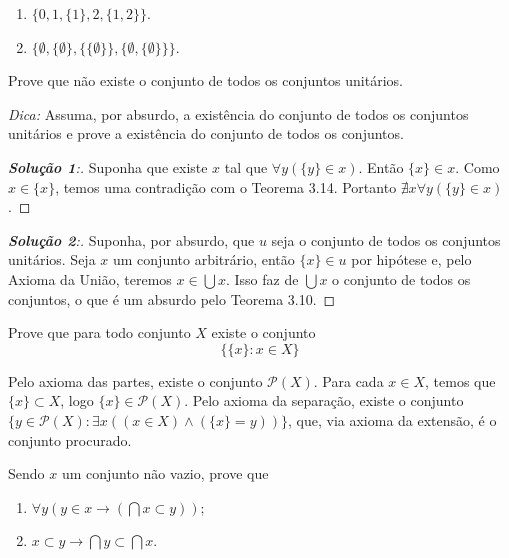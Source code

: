 \begin{enumerate}[label=(\alph{*})]
	\item $\{0,1,\{1\},2,\{1,2\}\}$.
	\item $\{\emptyset,\{\emptyset\},\{\{\emptyset\}\},\{\emptyset,\{\emptyset\}\}\}$.
\end{enumerate}


\begin{exercicio}
	Prove que não existe o conjunto de todos os conjuntos unitários.
	
	\emph{Dica:} Assuma, por absurdo, a existência do conjunto de todos os conjuntos unitários e prove a existência do conjunto de todos os conjuntos.
\end{exercicio}

\begin{proof}[\textbf{Solução 1}:]
	Suponha que existe $x$ tal que $\forall y(\{y\}\in x)$. Então $\{x\}\in x$. Como $x\in\{x\}$, temos uma contradição com o Teorema 3.14. Portanto $\nexists x\forall y(\{y\}\in x)$.
\end{proof}
	
\begin{proof}[\textbf{Solução 2}:]
	Suponha, por absurdo, que $u$ seja o conjunto de todos os conjuntos unitários. Seja $x$ um conjunto arbitrário, então $\{x\} \in u$ por hipótese e, pelo Axioma da União, teremos $x \in \bigcup x$. Isso faz de $\bigcup x$ o conjunto de todos os conjuntos, o que é um absurdo pelo Teorema 3.10.
\end{proof}
	

\begin{exercicio}
	Prove que para todo conjunto $X$ existe o conjunto
	$$\{\{x\}:x\in X\}$$
\end{exercicio}
\begin{solucao}
	Pelo axioma das partes, existe o conjunto $\mathcal{P}(X)$. Para cada $x\in X$, temos que $\{x\}\subset X$, logo $\{x\}\in\mathcal{P}(X)$. Pelo axioma da separação, existe o conjunto $\{y\in \mathcal{P}(X):\exists x((x\in X)\wedge(\{x\}=y))\}$, que, via axioma da extensão, é o conjunto procurado.
\end{solucao}

\begin{exercicio}
	Sendo $x$ um conjunto não vazio, prove que
	\begin{enumerate}[label=(\alph{*})]
		\item $\forall y(y\in x\to(\bigcap x\subset y))$;
		\item $x\subset y\to \bigcap y\subset \bigcap x$.
	\end{enumerate}
\end{exercicio}

